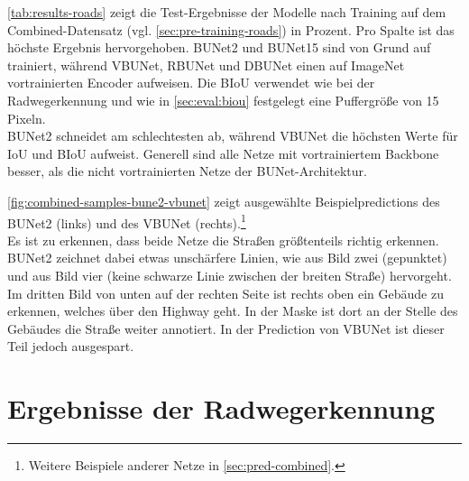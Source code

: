 \autoref{tab:results-roads} zeigt die Test-Ergebnisse der Modelle nach Training auf dem Combined-Datensatz 
(vgl. \autoref{sec:pre-training-roads}) in Prozent. Pro Spalte ist das höchste Ergebnis hervorgehoben. 
\ac{BUNet2} und \ac{BUNet15} sind von Grund auf trainiert, während \ac{VBUNet}, \ac{RBUNet} und \ac{DBUNet} einen auf 
ImageNet vortrainierten Encoder aufweisen. Die \ac{BIoU} verwendet wie bei der Radwegerkennung und wie in \autoref{sec:eval:biou} 
festgelegt eine Puffergröße von 15 Pixeln. \\ 
BUNet2 schneidet am schlechtesten ab, während VBUNet die höchsten Werte für IoU und BIoU aufweist. 
Generell sind alle Netze mit vortrainiertem Backbone besser, als die nicht vortrainierten Netze 
der BUNet-Architektur. 

\autoref{fig:combined-samples-bune2-vbunet} zeigt ausgewählte Beispielpredictions des \ac{BUNet2} (links) und 
des \ac{VBUNet} (rechts).\footnote{Weitere Beispiele anderer Netze in \autoref{sec:pred-combined}.} \\
Es ist zu erkennen, dass beide Netze die Straßen größtenteils richtig erkennen. 
BUNet2 zeichnet dabei etwas unschärfere Linien, wie aus Bild zwei (gepunktet) und aus Bild vier 
(keine schwarze Linie zwischen der breiten Straße) hervorgeht. Im dritten Bild von unten 
auf der rechten Seite ist rechts oben ein Gebäude zu erkennen, welches über den Highway geht. 
In der Maske ist dort an der Stelle des Gebäudes die Straße weiter annotiert. 
In der Prediction von VBUNet ist dieser Teil jedoch ausgespart.  

\section{Ergebnisse der Radwegerkennung}

